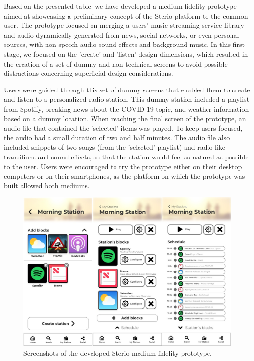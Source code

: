 Based on the presented table, we have developed a medium fidelity prototype aimed at showcasing a preliminary concept of the Sterio platform to the common user. The prototype focused on merging a users' music streaming service library and audio dynamically generated from news, social networks, or even personal sources, with non-speech audio sound effects and background music. In this first stage, we focused on the 'create' and 'listen' design dimensions, which resulted in the creation of a set of dummy and non-technical screens to avoid possible distractions concerning superficial design considerations.

Users were guided through this set of dummy screens that enabled them to create and listen to a personalized radio station. This dummy station included a playlist from Spotify, breaking news about the COVID-19 topic, and weather information based on a dummy location. When reaching the final screen of the prototype, an audio file that contained the 'selected' items was played. To keep users focused, the audio had a small duration of two and half minutes. The audio file also included snippets of two songs (from the 'selected' playlist) and radio-like transitions and sound effects, so that the station would feel as natural as possible to the user. Users were encouraged to try the prototype either on their desktop computers or on their smartphones, as the platform on which the prototype was built allowed both mediums.

\begin{figure}[!h]
    \centering
    \includegraphics[width=\columnwidth]{./Images/prototype.jpg}
    \caption{Screenshots of the developed Sterio medium fidelity prototype.}
    \label{fig:persona}
\end{figure}

